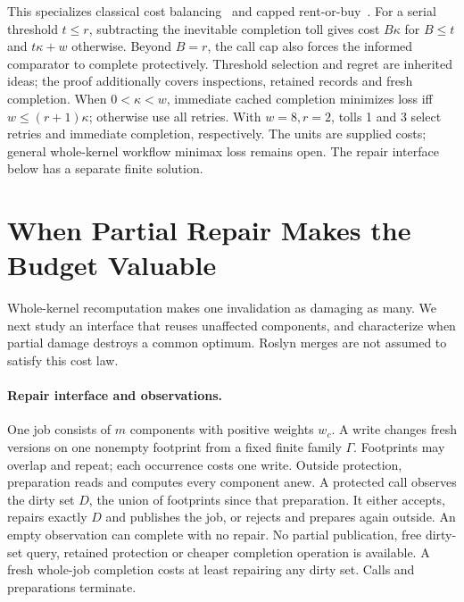 This specializes classical cost balancing~\cite{karlin1988} and capped rent-or-buy~\cite{lotker2012}. For a serial threshold $t\le r$, subtracting the inevitable completion toll gives cost $B\kappa$ for $B\le t$ and $t\kappa+w$ otherwise. Beyond $B=r$, the call cap also forces the informed comparator to complete protectively. Threshold selection and regret are inherited ideas; the proof additionally covers inspections, retained records and fresh completion. When $0<\kappa<w$, immediate cached completion minimizes loss iff $w\le(r+1)\kappa$; otherwise use all retries. With $w=8,r=2$, tolls 1 and 3 select retries and immediate completion, respectively. The units are supplied costs; general whole-kernel workflow minimax loss remains open. The repair interface below has a separate finite solution.

\section{When Partial Repair Makes the Budget Valuable}
\label{sec:partial}

Whole-kernel recomputation makes one invalidation as damaging as many. We next study an interface that reuses unaffected components, and characterize when partial damage destroys a common optimum. Roslyn merges are not assumed to satisfy this cost law.

\paragraph{Repair interface and observations.}
One job consists of $m$ components with positive weights $w_c$. A write changes fresh versions on one nonempty footprint from a fixed finite family $\Gamma$. Footprints may overlap and repeat; each occurrence costs one write. Outside protection, preparation reads and computes every component anew. A protected call observes the dirty set $D$, the union of footprints since that preparation. It either accepts, repairs exactly $D$ and publishes the job, or rejects and prepares again outside. An empty observation can complete with no repair. No partial publication, free dirty-set query, retained protection or cheaper completion operation is available. A fresh whole-job completion costs at least repairing any dirty set. Calls and preparations terminate.

